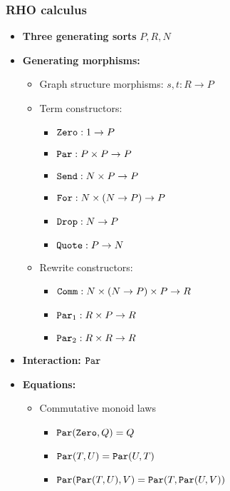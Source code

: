 \documentclass{article}
\begin{document}
\subsubsection{RHO calculus}

\begin{itemize}
    \item \textbf{Three generating sorts} $P, R, N$
    \item \textbf{Generating morphisms:}
    \begin{itemize}
        \item Graph structure morphisms: $s, t : R \to P$
        \item Term constructors: 
        \begin{itemize}
            \item ${\tt Zero} : 1 \to P$
            \item ${\tt Par} : P \times P \to P$
            \item ${\tt Send} : N \times P \to P$
            \item ${\tt For} : N \times (N \to P) \to P$
            \item ${\tt Drop} : N \to P$
            \item ${\tt Quote} : P \to N$
        \end{itemize}
        \item Rewrite constructors:
        \begin{itemize}
            \item ${\tt Comm} : N \times (N \to P) \times P \to R$
            \item ${\tt Par}_1 : R \times P \to R$
            \item ${\tt Par}_2 : R \times R \to R$
        \end{itemize}
    \end{itemize}
    \item \textbf{Interaction:} ${\tt Par}$
    \item \textbf{Equations:}
    \begin{itemize}
        \item Commutative monoid laws
            \begin{itemize}
                \item ${\tt Par}({\tt Zero}, Q) = Q$
                \item ${\tt Par}(T, U) = {\tt Par}(U, T)$
                \item ${\tt Par}({\tt Par}(T, U), V) = {\tt Par}(T, {\tt Par}(U, V))$
            \end{itemize}

\end{itemize}
\end{itemize}
\end{document}
